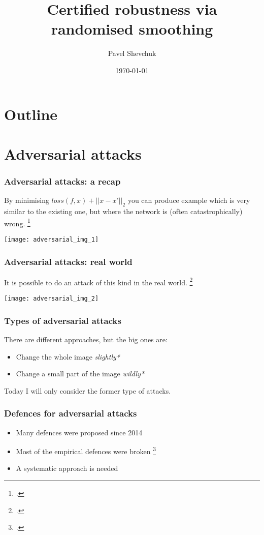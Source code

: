 \documentclass{beamer}
\title{Certified robustness via randomised smoothing}
\author{Pavel Shevchuk}
\date{\today}
\begin{document}
\frame{\titlepage}

\section{Outline}
\frame{\tableofcontents}

\section{Adversarial attacks}
\frame
{
  \frametitle{Adversarial attacks: a recap}

  By minimising $ loss(f, x) + ||x-x'||_2$ you can produce example which is very similar to the existing one, but where the network is (often catastrophically) wrong.
  \footcite{szegedy2014intriguing}
      \begin{center}
  \texttt{[image: adversarial\_img\_1]}
  \end{center}
}
\frame
{
  \frametitle{Adversarial attacks: real world}

  It is possible to do an attack of this kind in the real world. \footcite{kurakin2017adversarial, Sharif16AdvML}
    \begin{center}
  \texttt{[image: adversarial\_img\_2]}
  \end{center}
}

\frame
{
  \frametitle{Types of adversarial attacks}
  There are different approaches, but the big ones are:
  \begin{itemize}
  \item Change the whole image \em *slightly* \em
  \item Change a small part of the image \em *wildly* \em
  \end{itemize}
  
  Today I will only consider the former type of attacks.
  }

\frame
{
\frametitle{Defences for adversarial attacks}
	\begin{itemize}
	\item Many defences were proposed since 2014
	\item Most of the empirical defences were broken \footcite{athalye2018robustness,carlini2017adversarial}
	\item A systematic approach is needed
	\end{itemize}
}
\end{document}
